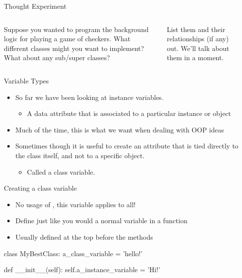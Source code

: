 \documentclass[pdf, aspectratio=169, 12pt]{beamer}
\begin{document}
\begin{frame}{Thought Experiment}
	\begin{columns}
		Suppose you wanted to program the background logic for playing a game of checkers. What different classes might you want to implement? What about any sub/super classes?
		
		\vspace{5mm}
		List them and their relationships (if any) out. We'll talk about them in a moment.
		
		\begin{center}
		\end{center}
	\end{columns}
\end{frame}

\begin{frame}{Variable Types}
	\begin{itemize}
		\item So far we have been looking at \alert{instance variables}.
			\begin{itemize}
				\item A data attribute that is associated to a particular instance or object
			\end{itemize}
		\item Much of the time, this is what we want when dealing with OOP ideas
		\item Sometimes though it is useful to create an attribute that is tied directly to the class itself, and not to a specific object.
			\begin{itemize}
				\item Called a \alert{class variable}.
			\end{itemize}
	\end{itemize}
\end{frame}

\begin{frame}[fragile]{Creating a class variable}
	\begin{itemize}
		\item No usage of , this variable applies to all!
		\item Define just like you would a normal variable in a function
		\item Usually defined at the top before the methods
	\end{itemize}
	
	\begin{pythoncode}
		class MyBestClass:
			a_class_variable = 'hello!'

			def __init__(self):
				self.a_instance_variable = 'Hi!'
	\end{pythoncode}
\end{frame}
\end{document}
